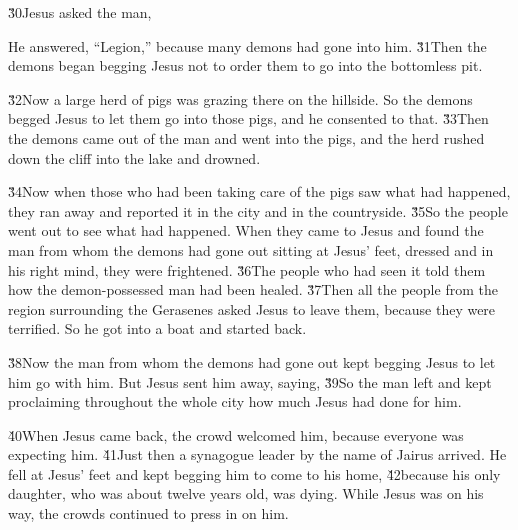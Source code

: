 \v{30}Jesus asked the man, 

He answered, ``Legion,'' because many demons had gone into him. \v{31}Then the demons began begging Jesus not to order them to go into the bottomless pit.

\v{32}Now a large herd of pigs was grazing there on the hillside. So the demons begged Jesus to let them go into those pigs, and he consented to that. \v{33}Then the demons came out of the man and went into the pigs, and the herd rushed down the cliff into the lake and drowned.

\v{34}Now when those who had been taking care of the pigs saw what had happened, they ran away and reported it in the city and in the countryside. \v{35}So the people went out to see what had happened. When they came to Jesus and found the man from whom the demons had gone out sitting at Jesus' feet, dressed and in his right mind, they were frightened. \v{36}The people who had seen it told them how the demon-possessed man had been healed. \v{37}Then all the people from the region surrounding the Gerasenes asked Jesus to leave them, because they were terrified. So he got into a boat and started back.

\v{38}Now the man from whom the demons had gone out kept begging Jesus to let him go with him. But Jesus sent him away, saying, \v{39}So the man left and kept proclaiming throughout the whole city how much Jesus had done for him.

\v{40}When Jesus came back, the crowd welcomed him, because everyone was expecting him. \v{41}Just then a synagogue leader by the name of Jairus arrived. He fell at Jesus' feet and kept begging him to come to his home, \v{42}because his only daughter, who was about twelve years old, was dying. While Jesus was on his way, the crowds continued to press in on him.

